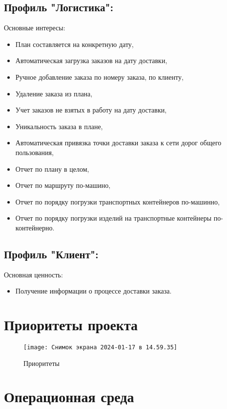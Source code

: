 \subsection{Профиль "Логистика":}
\label{subsec:log}

Основные интересы:
\begin{itemize}
    \item План составляется на конкретную дату,
    \item Автоматическая загрузка заказов на дату доставки,
    \item Ручное добавление заказа по номеру заказа, по клиенту,
    \item Удаление заказа из плана,
    \item Учет заказов не взятых в работу на дату доставки,
    \item Уникальность заказа в плане,
    \item Автоматическая привязка точки доставки заказа к сети дорог общего пользования,
    \item Отчет по плану в целом,
    \item Отчет по маршруту по-машино,
    \item Отчет по порядку погрузки транспортных контейнеров по-машинно,
    \item Отчет по порядку погрузки изделий на транспортные контейнеры по-контейнерно.
\end{itemize}

\subsection{Профиль "Клиент":}
\label{subsec:customer}

Основная ценность:
\begin{itemize}
    \item Получение информации о процессе доставки заказа.
\end{itemize}


\section{Приоритеты проекта}
\label{sec:priorities}

\begin{figure}[H]
    \centering
    \texttt{[image: Снимок экрана 2024-01-17 в 14.59.35]}
    \caption{Приоритеты}
    \label{fig:}
\end{figure}

\section{Операционная среда}
\label{sec:env}

